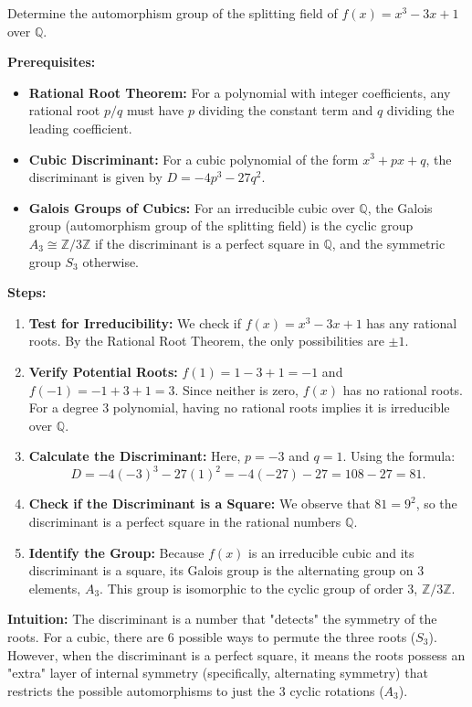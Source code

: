 \begin{exercise}
\label{algebra:2021:2}
Determine the automorphism group of the splitting field of $f(x) = x^3 - 3x + 1$ over $\mathbb{Q}$.
\end{exercise}

\begin{solution}
\textbf{Prerequisites:}
\begin{itemize}
    \item \textbf{Rational Root Theorem:} For a polynomial with integer coefficients, any rational root $p/q$ must have $p$ dividing the constant term and $q$ dividing the leading coefficient.
    \item \textbf{Cubic Discriminant:} For a cubic polynomial of the form $x^3 + px + q$, the discriminant is given by $D = -4p^3 - 27q^2$.
    \item \textbf{Galois Groups of Cubics:} For an irreducible cubic over $\mathbb{Q}$, the Galois group (automorphism group of the splitting field) is the cyclic group $A_3 \cong \mathbb{Z}/3\mathbb{Z}$ if the discriminant is a perfect square in $\mathbb{Q}$, and the symmetric group $S_3$ otherwise.
\end{itemize}

\textbf{Steps:}
\begin{enumerate}
    \item \textbf{Test for Irreducibility:} We check if $f(x) = x^3 - 3x + 1$ has any rational roots. By the Rational Root Theorem, the only possibilities are $\pm 1$.
    \item \textbf{Verify Potential Roots:} $f(1) = 1-3+1 = -1$ and $f(-1) = -1+3+1 = 3$. Since neither is zero, $f(x)$ has no rational roots. For a degree 3 polynomial, having no rational roots implies it is irreducible over $\mathbb{Q}$.
    \item \textbf{Calculate the Discriminant:} Here, $p = -3$ and $q = 1$. Using the formula:
    $$D = -4(-3)^3 - 27(1)^2 = -4(-27) - 27 = 108 - 27 = 81.$$
    \item \textbf{Check if the Discriminant is a Square:} We observe that $81 = 9^2$, so the discriminant is a perfect square in the rational numbers $\mathbb{Q}$.
    \item \textbf{Identify the Group:} Because $f(x)$ is an irreducible cubic and its discriminant is a square, its Galois group is the alternating group on 3 elements, $A_3$. This group is isomorphic to the cyclic group of order 3, $\mathbb{Z}/3\mathbb{Z}$.
\end{enumerate}

\textbf{Intuition:}
The discriminant is a number that "detects" the symmetry of the roots. For a cubic, there are 6 possible ways to permute the three roots ($S_3$). However, when the discriminant is a perfect square, it means the roots possess an "extra" layer of internal symmetry (specifically, alternating symmetry) that restricts the possible automorphisms to just the 3 cyclic rotations ($A_3$).
\end{solution}

